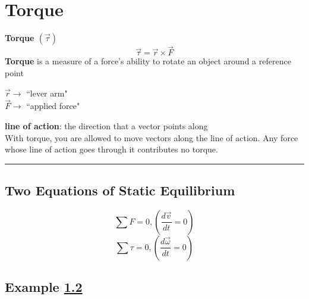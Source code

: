 \documentclass{article}
\begin{document}
\newcommand{\hr}{\par\noindent\rule{\textwidth}{0.4pt}}

\newcommand{\bc}[1]{
	\begin{equation*}
		\begin{boxed}
			{#1}
		\end{boxed}
	\end{equation*}
}

\let\DeclareUSUnit\DeclareSIUnit
\let\US\SI
\DeclareUSUnit{}

\tableofcontents

\section{Torque}
\textbf{Torque $ (\vec{\tau}) $}
$$ \vec{\tau} = \vec{r} \times \vec{F} $$
\textbf{Torque} is a measure of a force's ability to rotate an object around a reference point

$ \vec{r} \rightarrow $ ``lever arm" \\
$ \vec{F} \rightarrow $ ``applied force"

\textbf{line of action}: the direction that a vector points along \\
With torque, you are allowed to move vectors along the line of action. Any force whose line of action goes through it contributes no torque.

\hr

\subsection{Two Equations of Static Equilibrium}

\begin{equation}
	\sum F = 0, \left( \frac{d\vec{v}}{dt} = 0 \right)
\end{equation}
\begin{equation}
	\sum \tau = 0, \left( \frac{d\vec{\omega}}{dt} = 0 \right)
\end{equation}

\subsection{Example \ref{example:1}} \label{example:1}
\end{document}
